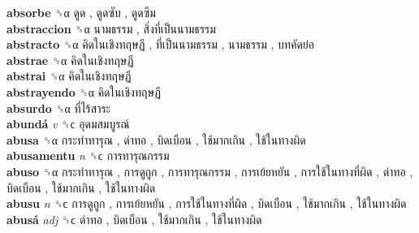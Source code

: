 \textbf{absorbe} ␝α   ดูด ,  ดูดซับ ,  ดูดซึม   \\
\textbf{abstraccion} ␝α   นามธรรม ,  สิ่งที่เป็นนามธรรม   \\
\textbf{abstracto} ␝α   คิดในเชิงทฤษฏี ,  ที่เป็นนามธรรม ,  นามธรรม ,  บทคัดย่อ   \\
\textbf{abstrae} ␝α   คิดในเชิงทฤษฏี   \\
\textbf{abstrai} ␝α   คิดในเชิงทฤษฏี   \\
\textbf{abstrayendo} ␝α   คิดในเชิงทฤษฏี   \\
\textbf{absurdo} ␝α   ที่ไร้สาระ   \\
\textbf{abundá} \emph{v}  ␝ϲ   อุดมสมบูรณ์   \\
\textbf{abusa} ␝α   กระทำทารุณ ,  ด่าทอ ,  บิดเบือน ,  ใช้มากเกิน ,  ใช้ในทางผิด   \\
\textbf{abusamentu} \emph{n}  ␝ϲ   การทารุณกรรม   \\
\textbf{abuso} ␝α   กระทำทารุณ ,  การดูถูก ,  การทารุณกรรม ,  การเย้ยหยัน ,  การใช้ในทางที่ผิด ,  ด่าทอ ,  บิดเบือน ,  ใช้มากเกิน ,  ใช้ในทางผิด   \\
\textbf{abusu} \emph{n}  ␝ϲ   การดูถูก ,  การเย้ยหยัน ,  การใช้ในทางที่ผิด ,  บิดเบือน ,  ใช้มากเกิน ,  ใช้ในทางผิด   \\
\textbf{abusá} \emph{adj}  ␝ϲ   ด่าทอ ,  บิดเบือน ,  ใช้มากเกิน ,  ใช้ในทางผิด   \\
